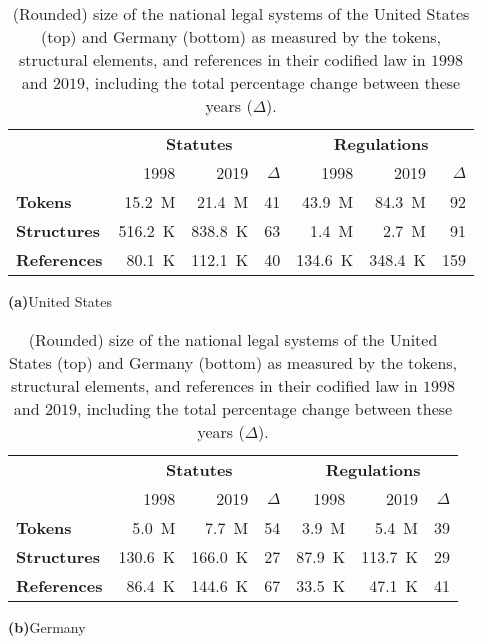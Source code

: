 \documentclass[utf8,sort&compress,table,hidelinks]{frontiersFPHY} %
\begin{document}
\begin{table}
	\centering
			\renewcommand{\arraystretch}{1.5}
				\begin{tabular}{lrrrrrr}
\toprule & \multicolumn{3}{c}{\textbf{Statutes}} & \multicolumn{3}{c}{\textbf{Regulations}} \\
            & 1998   & 2019   &   $\Delta$ & 1998   & 2019   &   $\Delta$ \\
\midrule
 \textbf{Tokens}     & 15.2~M               & 21.4~M               &                      41 & 43.9~M                  & 84.3~M                  &                         92 \\
 \textbf{Structures} & 516.2~K              & 838.8~K              &                      63 & 1.4~M                   & 2.7~M                   &                         91 \\
 \textbf{References} & 80.1~K               & 112.1~K              &                      40 & 134.6~K                 & 348.4~K                 &                        159 \\
\bottomrule
\end{tabular}
				
				{\vspace*{6pt}\small \textbf{\textsf{(a)}}\quad United States}\vspace*{12pt}
			
				\begin{tabular}{lrrrrrr}
\toprule & \multicolumn{3}{c}{\textbf{Statutes}} & \multicolumn{3}{c}{\textbf{Regulations}} \\
            & 1998   & 2019   &   $\Delta$ & 1998   & 2019   &   $\Delta$ \\
\midrule
 \textbf{Tokens}     & 5.0~M                & 7.7~M                &                      54 & 3.9~M                   & 5.4~M                   &                         39 \\
 \textbf{Structures} & 130.6~K              & 166.0~K              &                      27 & 87.9~K                  & 113.7~K                 &                         29 \\
 \textbf{References} & 86.4~K               & 144.6~K              &                      67 & 33.5~K                  & 47.1~K                  &                         41 \\
\bottomrule
\end{tabular}
				
				{\vspace*{6pt}\small \textbf{\textsf{(b)}}\quad Germany} 

	\caption{(Rounded) size of the national legal systems of the United States (top) and Germany (bottom) as measured by the tokens, structural elements, and references in their codified law in $1998$ and $2019$, including the total percentage change between these years ($\Delta$).}\label{tab:basic-statistics}
\end{table}
\end{document}
